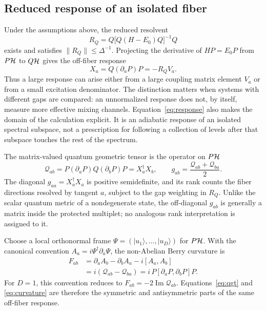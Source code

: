 \subsection{Reduced response of an isolated fiber}

Under the assumptions above, the reduced resolvent
\[
 R_Q=Q\bigl[Q(H-E_0)Q\bigr]^{-1}Q
\]
exists and satisfies $\lVert R_Q\rVert\leq\Delta^{-1}$.  Projecting the
derivative of $HP=E_0P$ from $P\mathcal H$ to $Q\mathcal H$ gives the off-fiber response
\begin{equation}
 X_a=Q(\partial_aP)P=-R_QV_a .
 \label{eq:response}
\end{equation}
Thus a large response can arise either from a large coupling matrix element
$V_a$ or from a small excitation denominator.  The distinction matters when
systems with different gaps are compared: an unnormalized response does not,
by itself, measure more effective mixing channels.  Equation~\eqref{eq:response}
also makes the domain of the calculation explicit.  It is an adiabatic
response of an isolated spectral subspace, not a prescription for following a
collection of levels after that subspace touches the rest of the spectrum.

The matrix-valued quantum geometric tensor is the operator on $P\mathcal H$
\begin{equation}
 \mathcal Q_{ab}
 =P(\partial_aP)Q(\partial_bP)P
 =X_a^\dagger X_b,
 \qquad
 g_{ab}=\frac{\mathcal Q_{ab}+\mathcal Q_{ba}}{2}.
 \label{eq:qgt}
\end{equation}
The diagonal $g_{aa}=X_a^\dagger X_a$ is positive semidefinite, and its rank
counts the fiber directions resolved by tangent $a$, subject to the gap
weighting in $R_Q$.  Unlike the scalar quantum metric of a nondegenerate
state, the off-diagonal $g_{ab}$ is generally a matrix inside the protected
multiplet; no analogous rank interpretation is assigned to it.

Choose a local orthonormal frame $\Psi=(|u_1\rangle,\ldots,|u_D\rangle)$ for
$P\mathcal H$.  With the canonical convention
$A_a=i\Psi^\dagger\partial_a\Psi$, the non-Abelian Berry curvature is
\begin{equation}
 \begin{split}
 F_{ab}&=\partial_aA_b-\partial_bA_a-i[A_a,A_b]\\
 &=i(\mathcal Q_{ab}-\mathcal Q_{ba})
 =i\,P[\partial_aP,\partial_bP]P .
 \end{split}
 \label{eq:curvature}
\end{equation}
For $D=1$, this convention reduces to
$F_{ab}=-2\operatorname{Im}\mathcal Q_{ab}$.  Equations~\eqref{eq:qgt} and
\eqref{eq:curvature} are therefore the symmetric and antisymmetric parts of
the same off-fiber response.

